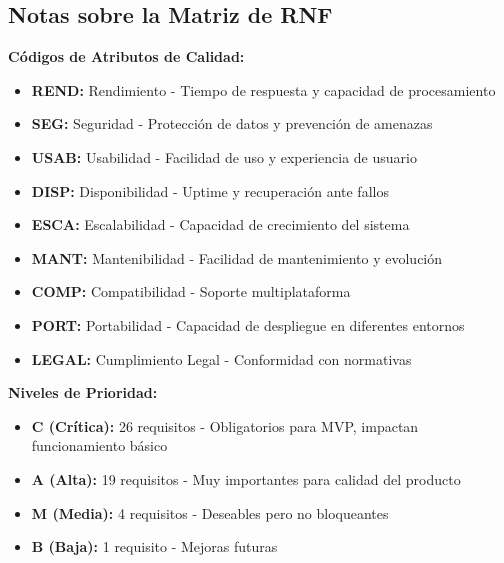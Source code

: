 \documentclass[12pt,a4paper]{article}
\begin{document}
\subsection{Notas sobre la Matriz de RNF}

\textbf{Códigos de Atributos de Calidad:}
\begin{itemize}[noitemsep]
    \item \textbf{REND:} Rendimiento - Tiempo de respuesta y capacidad de procesamiento
    \item \textbf{SEG:} Seguridad - Protección de datos y prevención de amenazas
    \item \textbf{USAB:} Usabilidad - Facilidad de uso y experiencia de usuario
    \item \textbf{DISP:} Disponibilidad - Uptime y recuperación ante fallos
    \item \textbf{ESCA:} Escalabilidad - Capacidad de crecimiento del sistema
    \item \textbf{MANT:} Mantenibilidad - Facilidad de mantenimiento y evolución
    \item \textbf{COMP:} Compatibilidad - Soporte multiplataforma
    \item \textbf{PORT:} Portabilidad - Capacidad de despliegue en diferentes entornos
    \item \textbf{LEGAL:} Cumplimiento Legal - Conformidad con normativas
\end{itemize}

\textbf{Niveles de Prioridad:}
\begin{itemize}[noitemsep]
    \item \textbf{C (Crítica):} 26 requisitos - Obligatorios para MVP, impactan funcionamiento básico
    \item \textbf{A (Alta):} 19 requisitos - Muy importantes para calidad del producto
    \item \textbf{M (Media):} 4 requisitos - Deseables pero no bloqueantes
    \item \textbf{B (Baja):} 1 requisito - Mejoras futuras
\end{itemize}
\end{document}

